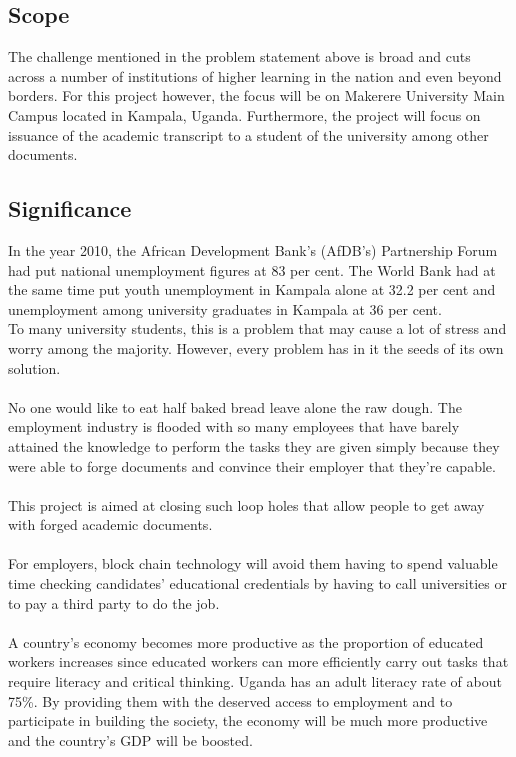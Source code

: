\subsection{Scope}

The challenge mentioned in the problem statement above is broad and cuts across a number of institutions of higher learning in the nation and even beyond borders. For this project however, the focus will be on Makerere University Main Campus located in Kampala, Uganda. Furthermore, the project will focus on issuance of the academic transcript to a student of the university among other documents.

\subsection{Significance}
In the year 2010, the African Development Bank’s (AfDB’s) Partnership Forum had put national unemployment figures at 83 per cent. The World Bank had at the same time put youth unemployment in Kampala alone at 32.2 per cent and unemployment among university graduates in Kampala at 36 per cent.\cite{art12}\\
To many university students, this is a problem that may cause a lot of stress and worry among the majority. However, every problem has in it the seeds of its own solution.\\\\
No one would like to eat half baked bread leave alone the raw dough. The employment industry is flooded with so many employees that have barely attained the knowledge to perform the tasks they are given simply because they were able to forge documents and convince their employer that they’re capable. \\\\
This project is aimed at closing such loop holes that allow people to get away with forged academic documents.\\\\
For employers, block chain technology will avoid them having to spend valuable time checking candidates' educational credentials by having to call universities or to pay a third party to do the job. \\\\
A country's economy becomes more productive as the proportion  of educated workers increases since educated workers can more efficiently carry out tasks that require literacy and critical thinking.
Uganda has an adult literacy rate of about 75\%\cite{art13}. By providing them with the deserved access to employment and to participate in building the society, the economy will be much more productive and the country's GDP will be
boosted.